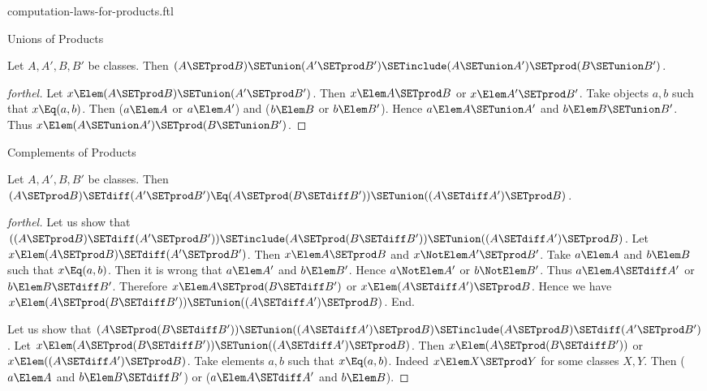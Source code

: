\documentclass{stex}
\begin{document}
\begin{smodule}{computation-laws-for-products.ftl}
\begin{sfragment}{Unions of Products}
  \begin{proposition}[forthel]
    Let $A, A', B, B'$ be classes.
    Then $(A \SETprod B) \SETunion (A' \SETprod B') \SETinclude (A \SETunion A') \SETprod (B \SETunion B')$.
  \end{proposition}
  \begin{proof}[forthel]
    Let $x \Elem (A \SETprod B) \SETunion (A' \SETprod B')$.
    Then $x \Elem A \SETprod B$ or $x \Elem A' \SETprod B'$.
    Take objects $a, b$ such that $x \Eq (a, b)$.
    Then ($a \Elem A$ or $a \Elem A'$) and ($b \Elem B$ or $b \Elem B'$).
    Hence $a \Elem A \SETunion A'$ and $b \Elem B \SETunion B'$.
    Thus $x \Elem (A \SETunion A') \SETprod (B \SETunion B')$.
  \end{proof}
\end{sfragment}

\begin{sfragment}{Complements of Products}
  \begin{proposition}[forthel]
    Let $A, A', B, B'$ be classes.
    Then $(A \SETprod B) \SETdiff (A' \SETprod B') \Eq (A \SETprod (B \SETdiff B')) \SETunion ((A \SETdiff A') \SETprod B)$.
  \end{proposition}
  \begin{proof}[forthel]
    Let us show that $((A \SETprod B) \SETdiff (A' \SETprod B')) \SETinclude (A \SETprod (B \SETdiff B')) \SETunion ((A \SETdiff A') \SETprod B)$.
      Let $x \Elem (A \SETprod B) \SETdiff (A' \SETprod B')$.
      Then $x \Elem A \SETprod B$ and $x \NotElem A' \SETprod B'$.
      Take $a \Elem A$ and $b \Elem B$ such that $x \Eq (a, b)$.
      Then it is wrong that $a \Elem A'$ and $b \Elem B'$.
      Hence $a \NotElem A'$ or $b \NotElem B'$.
      Thus $a \Elem A \SETdiff A'$ or $b \Elem B \SETdiff B'$.
      Therefore $x \Elem A \SETprod (B \SETdiff B')$ or $x \Elem (A \SETdiff A') \SETprod B$.
      Hence we have $x \Elem (A \SETprod (B \SETdiff B')) \SETunion ((A \SETdiff A') \SETprod B)$.
    End.

    Let us show that $(A \SETprod (B \SETdiff B')) \SETunion ((A \SETdiff A') \SETprod B) \SETinclude (A \SETprod B) \SETdiff (A' \SETprod B')$.
      Let $x \Elem (A \SETprod (B \SETdiff B')) \SETunion ((A \SETdiff A') \SETprod B)$.
      Then $x \Elem (A \SETprod (B \SETdiff B'))$ or $x \Elem ((A \SETdiff A') \SETprod B)$.
      Take elements $a,b$ such that $x \Eq (a, b)$.
      Indeed $x \Elem X \SETprod Y$ for some classes $X,Y$.
      Then ($a \Elem A$ and $b \Elem B \SETdiff B'$) or ($a \Elem A \SETdiff A'$ and $b \Elem B$).


\end{proof}
\end{sfragment}
\end{smodule}
\end{document}
